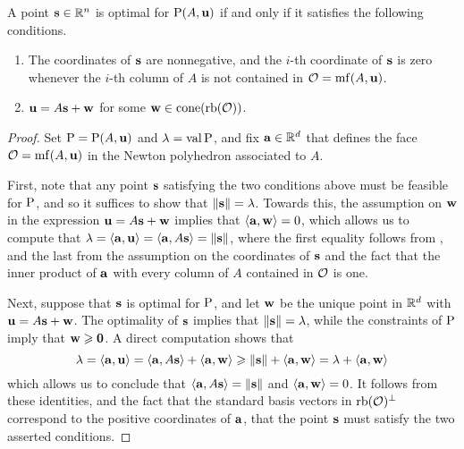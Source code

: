 \documentclass[11pt]{amsart}
\begin{document}
\begin{corollary}  
\label{opt set: C}
A point $\mathbf{s} \in \mathbb{R}^n$ is optimal for $\mathrm{P}(A, \mathbf{u})$ if and only if it satisfies the following conditions.
\begin{enumerate}
\item  \label{mc coords: e} The coordinates of $\mathbf{s}$ are nonnegative, and the $i$-th coordinate of $\mathbf{s}$ is zero whenever the $i$-th column of $A$ is not contained in $\mathcal{O} = \operatorname{mf}(A, \mathbf{u})$.
\item  \label{mc decomposition: e} $\mathbf{u} = A \mathbf{s} + \mathbf{w}$ for some $\mathbf{w} \in  \operatorname{cone}(\operatorname{rb}(\mathcal{O}))$.   
\end{enumerate}
\end{corollary}

\begin{proof}  
Set $\mathrm{P} = \mathrm{P}(A, \mathbf{u})$ and $\lambda = \operatorname{val} \mathrm{P}$, and fix $\mathbf{a} \in \mathbb{R}^d$ that defines the face $\mathcal{O} = \operatorname{mf}(A, \mathbf{u})$ in the Newton polyhedron associated to $A$. 

First, note that any point $\mathbf{s}$ satisfying the two conditions above must be feasible for $\mathrm{P}$, and so it suffices to show that $\| \mathbf{s} \| = \lambda$.
Towards this, the assumption on $\mathbf{w}$ in the expression $\mathbf{u} = A \mathbf{s} + \mathbf{w}$ implies that $\langle \mathbf{a}, \mathbf{w} \rangle = 0$, which allows us to compute that $\lambda = \langle \mathbf{a}, \mathbf{u} \rangle = \langle \mathbf{a}, A\mathbf{s} \rangle = \| \mathbf{s} \|$, where the first equality follows from 
, and the last from the assumption on the coordinates of $\mathbf{s}$ and the fact that the inner product of $\mathbf{a}$ with every column of $A$ contained in $\mathcal{O}$ is one.

Next, suppose that $\mathbf{s}$ is optimal for $\mathrm{P}$, and let $\mathbf{w}$ be the unique point in $\mathbb{R}^d$ with $\mathbf{u} = A \mathbf{s} + \mathbf{w}$.  The optimality of $\mathbf{s}$ implies that $\| \mathbf{s} \| = \lambda$, while the constraints of $\mathrm{P}$ imply that $\mathbf{w} \geqslant \mathbf{0}$.  A direct computation shows that
%
\[ \lambda = \langle \mathbf{a}, \mathbf{u} \rangle = \langle \mathbf{a}, A \mathbf{s} \rangle + \langle \mathbf{a}, \mathbf{w} \rangle \geqslant \| \mathbf{s} \| + \langle \mathbf{a}, \mathbf{w} \rangle = \lambda + \langle \mathbf{a}, \mathbf{w} \rangle \]
%
which allows us to conclude that $\langle \mathbf{a}, A \mathbf{s} \rangle = \| \mathbf{s} \|$ and $\langle \mathbf{a}, \mathbf{w} \rangle = 0$.
It follows from these identities, and the fact that the standard basis vectors in $\operatorname{rb}(\mathcal{O})^{\perp}$ correspond to the positive coordinates of $\mathbf{a}$, that the point $\mathbf{s}$ must satisfy the two asserted conditions.
\end{proof}
\end{document}
